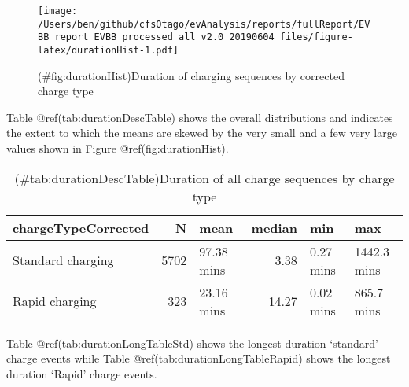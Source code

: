 \documentclass[]{article}
\begin{document}
\begin{figure}
\centering
\texttt{[image: /Users/ben/github/cfsOtago/evAnalysis/reports/fullReport/EVBB\_report\_EVBB\_processed\_all\_v2.0\_20190604\_files/figure-latex/durationHist-1.pdf]}
\caption{(\#fig:durationHist)Duration of charging sequences by corrected charge type}
\end{figure}

Table @ref(tab:durationDescTable) shows the overall distributions and indicates the extent to which the means are skewed by the very small and a few very large values shown in Figure @ref(fig:durationHist).

\begin{table}[t]

\caption{(\#tab:durationDescTable)Duration of all charge sequences by charge type}
\centering
\begin{tabular}{l|r|l|r|l|l}
\hline
chargeTypeCorrected & N & mean & median & min & max\\
\hline
Standard charging & 5702 & 97.38 mins & 3.38 & 0.27 mins & 1442.3 mins\\
\hline
Rapid charging & 323 & 23.16 mins & 14.27 & 0.02 mins & 865.7 mins\\
\hline
\end{tabular}
\end{table}

Table @ref(tab:durationLongTableStd) shows the longest duration `standard' charge events while Table @ref(tab:durationLongTableRapid) shows the longest duration `Rapid' charge events.
\end{document}
